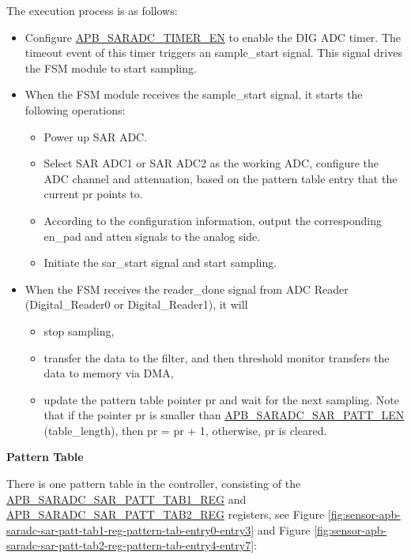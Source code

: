 \documentclass[main\_\_EN.tex]{subfiles}
\begin{document}
The execution process is as follows:
\begin{itemize}
\item Configure  \hyperref[fielddesc:APBSARADCSARADCTIMEREN]{APB\_SARADC\_TIMER\_EN} to enable the DIG ADC timer. The timeout event of this timer triggers an sample\_start signal. This signal drives the FSM module to start sampling.
\item When the FSM module receives the sample\_start signal, it starts the following operations:
\begin{itemize}
    \item Power up SAR ADC.
    \item Select SAR ADC1 or SAR ADC2 as the working ADC, configure the ADC channel and attenuation, based on the pattern table entry that the current pr points to.
    \item According to the configuration information, output the corresponding en\_pad and atten signals to the analog side.
    \item Initiate the sar\_start signal and start sampling.
\end{itemize}

    \item When the FSM receives the reader\_done signal from ADC Reader (Digital\_Reader0 or Digital\_Reader1), it will
    \begin{itemize}
        \item stop sampling,
        \item transfer the data to the filter, and then threshold monitor transfers the data to memory via DMA,
        \item update the pattern table pointer pr and wait for the next sampling. Note that if the pointer pr is smaller than \hyperref[fielddesc:APBSARADCSARADCSARPATTLEN]{APB\_SARADC\_SAR\_PATT\_LEN} (table\_length), then pr = pr + 1, otherwise, pr is cleared.
    \end{itemize}
\end{itemize}    
    



\textbf{Pattern Table}

There is one pattern table in the controller, consisting of the \hyperref[regdesc:APBSARADCSARPATTTAB1REG]{APB\_SARADC\_SAR\_PATT\_TAB1\_REG} and \hyperref[regdesc:APBSARADCSARPATTTAB1REG]{APB\_SARADC\_SAR\_PATT\_TAB2\_REG} registers, see Figure \ref{fig:sensor-apb-saradc-sar-patt-tab1-reg-pattern-tab-entry0-entry3} and Figure \ref{fig:sensor-apb-saradc-sar-patt-tab2-reg-pattern-tab-entry4-entry7}:
\end{document}
